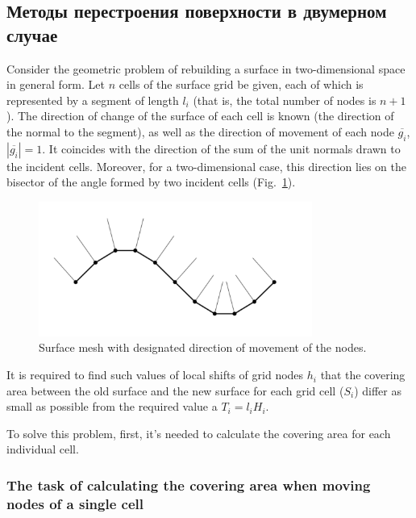 \subsection{Методы перестроения поверхности в двумерном случае}

Consider the geometric problem of rebuilding a surface in two-dimensional space in general form.
Let $n$ cells of the surface grid be given, each of which is represented by a segment of length $l_i$ (that is, the total number of nodes is $n+1$).
The direction of change of the surface of each cell is known (the direction of the normal to the segment), as well as the direction of movement of each node $\overline{g_i}$, $|\overline{g_i}| = 1$.
It coincides with the direction of the sum of the unit normals drawn to the incident cells.
Moreover, for a two-dimensional case, this direction lies on the bisector of the angle formed by two incident cells \cite{Fortin} (Fig.~\ref{fig:grid_normals}).

\begin{figure}[h]
\onelinecaptionstrue
\centering
\includegraphics[width=0.8\textwidth]{pics/text_1_remesh_2d/grid_normals.pdf}
\caption{Surface mesh with designated direction of movement of the nodes.}
\label{fig:grid_normals}
\end{figure}

It is required to find such values of local shifts of grid nodes $h_i$ that the covering area between the old surface and the new surface for each grid cell ($S_i$) differ as small as possible from the required value a $T_i = l_iH_i$.

To solve this problem, first, it's needed to calculate the covering area for each individual cell.

\subsubsection{The task of calculating the covering area when moving nodes of a single cell}


